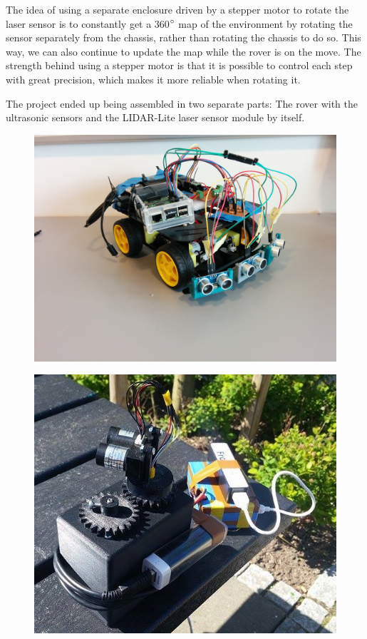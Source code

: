 The idea of using a separate enclosure driven by a stepper motor to rotate the laser sensor is to constantly get a 360$\degree$ map of the environment by rotating the sensor separately from the chassis, rather than rotating the chassis to do so. This way, we can also continue to update the map while the rover is on the move. The strength behind using a stepper motor is that it is possible to control each step with great precision, which makes it more reliable when rotating it.

The project ended up being assembled in two separate parts: The rover with the ultrasonic sensors and the LIDAR-Lite laser sensor module by itself.

\begin{figure}[H]
	\centering
	\includegraphics[width=.6\linewidth]{images/build_ultrasonic.jpg}
\end{figure}

\begin{figure}[H]
	\centering
	\includegraphics[width=.6\linewidth]{images/lidarpi.jpg}
\end{figure}